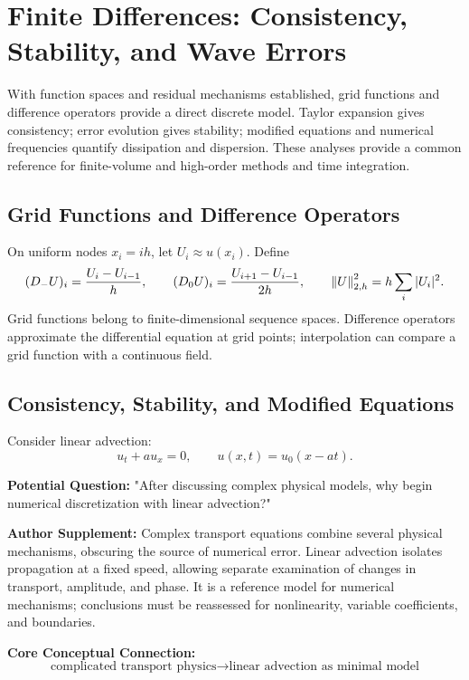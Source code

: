 \chapter{Finite Differences: Consistency, Stability, and Wave Errors}\label{ch:7}
\begin{chaptersummary}
With function spaces and residual mechanisms established, grid functions and difference operators provide a direct discrete model. Taylor expansion gives consistency; error evolution gives stability; modified equations and numerical frequencies quantify dissipation and dispersion. These analyses provide a common reference for finite-volume and high-order methods and time integration.
\end{chaptersummary}
\section{Grid Functions and Difference Operators}
On uniform nodes $x_i=ih$, let $U_i\approx u(x_i)$. Define
\[
(D_-U)_i=\frac{U_i-U_{i-1}}h,\qquad
(D_0U)_i=\frac{U_{i+1}-U_{i-1}}{2h},\qquad
\left\lVert U\right\rVert_{2,h}^2=h\sum_i|U_i|^2.
\]
Grid functions belong to finite-dimensional sequence spaces. Difference operators approximate the differential equation at grid points;
interpolation can compare a grid function with a continuous field.
\section{Consistency, Stability, and Modified Equations}
Consider linear advection:
\[
u_t+au_x=0,
\qquad
u(x,t)=u_0(x-at).
\]

\begin{authornote}
\textbf{Potential Question:}
"After discussing complex physical models, why begin numerical discretization with linear advection?"

\textbf{Author Supplement:}
Complex transport equations combine several physical mechanisms, obscuring the source of numerical error. Linear advection isolates propagation at a fixed speed, allowing separate examination of changes in transport, amplitude, and phase. It is a reference model for numerical mechanisms; conclusions must be reassessed for nonlinearity, variable coefficients, and boundaries.

\textbf{Core Conceptual Connection:}
\[
\text{complicated transport physics}
\longrightarrow
\text{linear advection as minimal model}
\]
\end{authornote}

